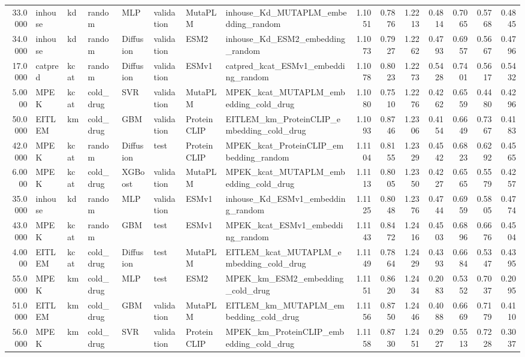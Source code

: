 \begin{tabular}{rlllllllrrrrrrr}
33.0000 & inhouse & kd & random & MLP & validation & MutaPLM & inhouse_Kd_MUTAPLM_embedding_random & 1.1051 & 0.7876 & 1.2213 & 0.4814 & 0.7065 & 0.5768 & 0.4845 \\
34.0000 & inhouse & kd & random & Diffusion & validation & ESM2 & inhouse_Kd_ESM2_embedding_random & 1.1073 & 0.7927 & 1.2262 & 0.4793 & 0.6957 & 0.5667 & 0.4796 \\
17.0000 & catpred & kcat & random & Diffusion & validation & ESMv1 & catpred_kcat_ESMv1_embedding_random & 1.1078 & 0.8023 & 1.2273 & 0.5428 & 0.7401 & 0.5617 & 0.5432 \\
5.0000 & MPEK & kcat & cold_drug & SVR & validation & MutaPLM & MPEK_kcat_MUTAPLM_embedding_cold_drug & 1.1080 & 0.7510 & 1.2276 & 0.4262 & 0.6559 & 0.4480 & 0.4296 \\
50.0000 & EITLEM & km & cold_drug & GBM & validation & ProteinCLIP & EITLEM_km_ProteinCLIP_embedding_cold_drug & 1.1093 & 0.8746 & 1.2306 & 0.4154 & 0.6649 & 0.7367 & 0.4183 \\
42.0000 & MPEK & kcat & random & Diffusion & test & ProteinCLIP & MPEK_kcat_ProteinCLIP_embedding_random & 1.1104 & 0.8155 & 1.2329 & 0.4542 & 0.6823 & 0.6292 & 0.4565 \\
6.0000 & MPEK & kcat & cold_drug & XGBoost & validation & MutaPLM & MPEK_kcat_MUTAPLM_embedding_cold_drug & 1.1113 & 0.8005 & 1.2350 & 0.4227 & 0.6565 & 0.5579 & 0.4257 \\
35.0000 & inhouse & kd & random & MLP & validation & ESMv1 & inhouse_Kd_ESMv1_embedding_random & 1.1125 & 0.8048 & 1.2376 & 0.4744 & 0.6959 & 0.5805 & 0.4774 \\
43.0000 & MPEK & kcat & random & GBM & test & ESMv1 & MPEK_kcat_ESMv1_embedding_random & 1.1143 & 0.8472 & 1.2416 & 0.4503 & 0.6896 & 0.6676 & 0.4504 \\
4.0000 & EITLEM & kcat & cold_drug & Diffusion & test & MutaPLM & EITLEM_kcat_MUTAPLM_embedding_cold_drug & 1.1149 & 0.7864 & 1.2429 & 0.4393 & 0.6684 & 0.5347 & 0.4395 \\
55.0000 & MPEK & km & cold_drug & MLP & test & ESM2 & MPEK_km_ESM2_embedding_cold_drug & 1.1151 & 0.8620 & 1.2434 & 0.2083 & 0.5352 & 0.7037 & 0.2095 \\
51.0000 & EITLEM & km & cold_drug & GBM & validation & MutaPLM & EITLEM_km_MUTAPLM_embedding_cold_drug & 1.1156 & 0.8750 & 1.2446 & 0.4088 & 0.6669 & 0.7179 & 0.4110 \\
56.0000 & MPEK & km & cold_drug & SVR & validation & ProteinCLIP & MPEK_km_ProteinCLIP_embedding_cold_drug & 1.1158 & 0.8730 & 1.2451 & 0.2927 & 0.5513 & 0.7228 & 0.3037 \\

\end{tabular}
